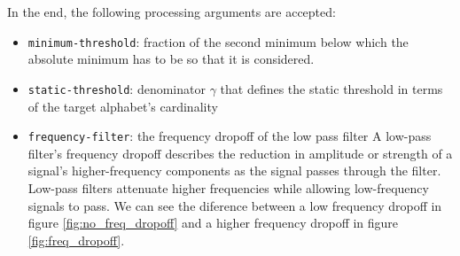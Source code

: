 \documentclass{article}
\begin{document}
In the end, the following processing arguments are accepted:
\begin{itemize}
    \item \verb|minimum-threshold|: fraction of the second minimum below which the absolute minimum has to be so that it is considered.
    \item \verb|static-threshold|: denominator $\gamma$ that defines the static threshold in terms of the target alphabet's cardinality
    \item \verb|frequency-filter|: the frequency dropoff of the low pass filter
    A low-pass filter's frequency dropoff describes the reduction in amplitude or strength of a signal's higher-frequency components as the signal passes through the filter. 
    Low-pass filters attenuate higher frequencies while allowing low-frequency signals to pass. 
    We can see the diference between a low frequency dropoff in figure \ref{fig:no_freq_dropoff} and a higher frequency dropoff in figure \ref{fig:freq_dropoff}.


\end{itemize}
\end{document}
